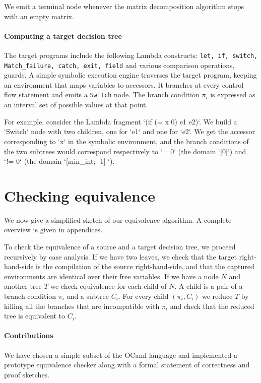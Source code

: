 \documentclass[12pt]{article}
\begin{document}
We emit a terminal node whenever the matrix decomposition algorithm stops with an empty matrix.

\paragraph{Computing a target decision tree}

The target programs include the following Lambda constructs:
\texttt{let, if, switch, Match\_failure, catch, exit, field} and
various comparison operations, guards. A simple symbolic execution
engine traverses the target program, keeping an environment that maps
variables to accessors. It branches at every control flow statement
and emits a \texttt{Switch} node. The branch condition $\pi_i$ is
expressed as an interval set of possible values at that point.


For example, consider the Lambda fragment `(if (= x 0) e1 e2)`. We build a `Switch` node with two children, one for `e1` and one for `e2`. We get the accessor corresponding to `x` in the symbolic environment, and the branch conditions of the two subtrees would correspond respectively to `= 0` (the domain `[0]`) and `!= 0` (the domain `[min_int; -1] `).

\section{Checking equivalence}

We now give a simplified sketch of our equivalence
algorithm. A complete overview is given in appendices.

To check the equivalence of a source and a target decision tree,
we proceed recursively by case analysis.
%
If we have two leaves, we check that the target right-hand-side is the
compilation of the source right-hand-side, and that the captured
environments are identical over their free variables.
%
If we have a node $N$ and another tree $T$ we check equivalence for
each child of $N$. A child is a pair of a branch condition $\pi_i$ and a
subtree $C_i$. For every child $(\pi_i, C_i)$ we reduce $T$ by killing all
the branches that are incompatible with $\pi_i$ and check that the
reduced tree is equivalent to $C_i$.

\paragraph{Contributions} We have chosen a simple subset of the OCaml
language and implemented a prototype equivalence checker along with
a formal statement of correctness and proof sketches.
\end{document}
